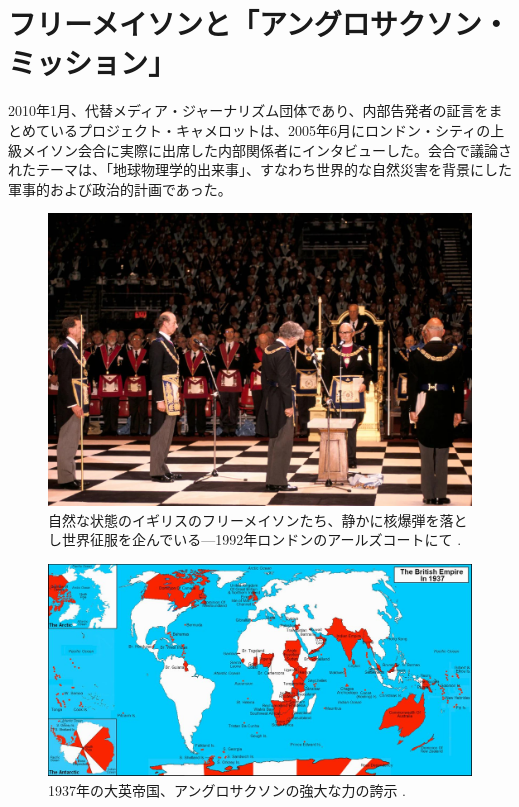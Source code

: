 \documentclass[10pt,twocolumn,letterpaper]{article}
\begin{document}
\section{フリーメイソンと「アングロサクソン・ミッション」}

2010年1月、代替メディア・ジャーナリズム団体であり、内部告発者の証言をまとめているプロジェクト・キャメロットは、2005年6月にロンドン・シティの上級メイソン会合に実際に出席した内部関係者にインタビューした\cite{4,6}。会合で議論されたテーマは、「地球物理学的出来事」、すなわち世界的な自然災害を背景にした軍事的および政治的計画であった。

\begin{figure}[b]
\begin{center}

\includegraphics[width=1\linewidth]{freemason.jpg}
\end{center}
   \caption{自然な状態のイギリスのフリーメイソンたち、静かに核爆弾を落とし世界征服を企んでいる—1992年ロンドンのアールズコートにて \cite{5}.}
\label{fig:1}
\label{fig:onecol}
\end{figure}

\begin{figure}[t]
\begin{center}
\includegraphics[width=1\textwidth]{british.jpg}
\end{center}
   \caption{1937年の大英帝国、アングロサクソンの強大な力の誇示 \cite{14}.}
   \label{fig:2}
\end{figure}
\end{document}
